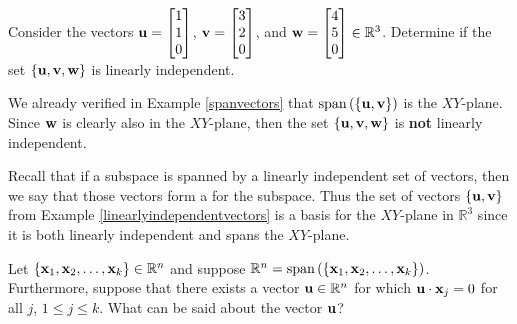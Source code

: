 \documentclass{ximera}
\begin{document}
\begin{example}\label{linearlyindependentvectors}
Consider the vectors ${\bf u}=\begin{bmatrix}
1  \\ 1 \\ 0
\end{bmatrix}$, 
${\bf v}=\begin{bmatrix}
3  \\ 2 \\ 0
\end{bmatrix}$, and
${\bf w}=\begin{bmatrix}
4  \\ 5 \\ 0
\end{bmatrix} \in \mathbb{R}^{3}$.
Determine if the set $\{{\bf u}, {\bf v}, {\bf w}\}$ is linearly independent.
\end{example}

\begin{explanation}
We already verified in Example \ref{spanvectors} that
$\mbox{span}\left( \{{\bf u}, {\bf v} \}\right)$ is the $XY$-plane. Since ${\bf w}$
is clearly also in the $XY$-plane, then the set $\{{\bf u}, {\bf v},
{\bf w}\}$ is \textbf{not} linearly independent.
\end{explanation}

Recall that if a subspace is spanned by a linearly independent set of vectors, then we say that those vectors form a  for the subspace.  Thus the set of vectors $\{{\bf u}, {\bf v}\}$ from Example
\ref{linearlyindependentvectors} is a basis for the $XY$-plane in
$\mathbb{R}^{3}$ since it is both linearly independent and spans
the $XY$-plane.

\begin{example}\label{OrthoVectoSpanningSet}
Let $\{{\bf x}_1, {\bf x}_2, \ldots, {\bf x}_k\}\in\mathbb{R}^n$ and
suppose $\mathbb{R}^n=\mbox{span}\left(\{{\bf x}_1, {\bf x}_2, \ldots, {\bf x}_k\}\right)$.
Furthermore, suppose that there exists a vector ${\bf u}\in\mathbb{R}^n$ for which ${\bf u}\cdot {\bf x}_j=0$ for all $j$, $1\leq j\leq k$.
What can be said about the vector ${\bf u}$?
\end{example}
\end{document}

